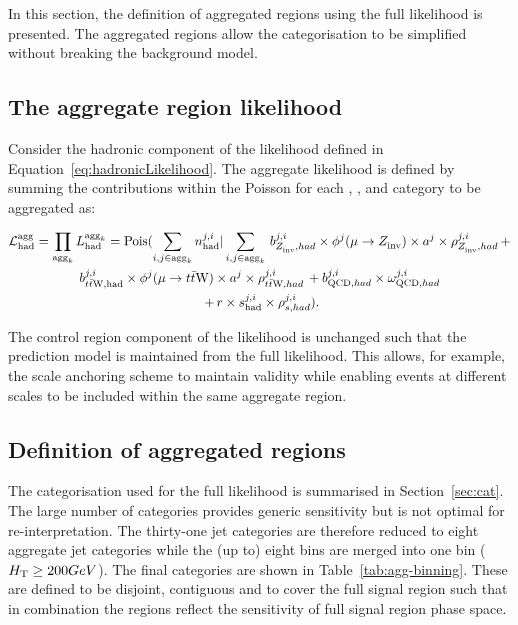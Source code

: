 In this section, the definition of aggregated regions 
using the full likelihood is presented. The aggregated regions allow the categorisation to be 
simplified without breaking the background model. 

\subsection{The aggregate region likelihood}

Consider the hadronic component of the likelihood defined in Equation~\ref{eq:hadronicLikelihood}.
The aggregate likelihood is defined by summing the contributions within the Poisson for
each \mht, \scalht, \nb and \njet category to be aggregated as:

\begin{multline}
\label{eq:aggregatedLikelihood}
\mathcal{L}^{\text{agg}}_{\mathrm{had}} = \prod_{\text{agg}_{k}} {L}^{\text{agg}_{k}}_{\mathrm{had}} = \mathrm{Pois}(\sum_{i,j\in\text{agg}_{k}} n^{j,i}_{\mathrm{had}} |\sum_{i,j\in\text{agg}_{k}}\, b^{j,i}_{Z_{\rm inv}^{~},had}\times\phi^{j}(\mu\rightarrow Z_{\rm inv}^{~})\times a^{j}\times\rho^{j,i}_{Z_{\rm inv}^{~},had}\, + \\ 
b^{j,i}_{t\bar{t}\text{W},\mathrm{had}}\times\phi^{j}(\mu\rightarrow t\bar{t}\text{W})\times a^{j}\times\rho^{j,i}_{t\bar{t}\text{W},had}\, + b^{j,i}_{\text{QCD},had}\times\omega^{j,i}_{\text{QCD},had}\\\
+ \,r\times s^{j,i}_{\mathrm{had}}\times\rho^{j,i}_{s,had}).
\end{multline}

The control region component of the likelihood is unchanged such that the prediction model
is maintained from the full likelihood. This allows, for example, the scale anchoring 
scheme to maintain validity while enabling events at different scales to be included 
within the same aggregate region.

\subsection{Definition of aggregated regions}
\label{sec:ssr-alphat}
The categorisation used for the full likelihood is summarised in Section~\ref{sec:cat}. 
The large number of categories provides generic sensitivity but is not optimal for re-interpretation. 
The thirty-one jet categories are therefore reduced to eight aggregate jet categories while
the (up to) eight \scalht bins are merged into one bin ($\mbox{$H_\text{T}$} \geq 200 GeV$).
The final categories are shown in Table~\ref{tab:agg-binning}.
These are defined to be disjoint, contiguous and to cover the full
signal region such that in combination the regions reflect the sensitivity of
full signal region phase space.


